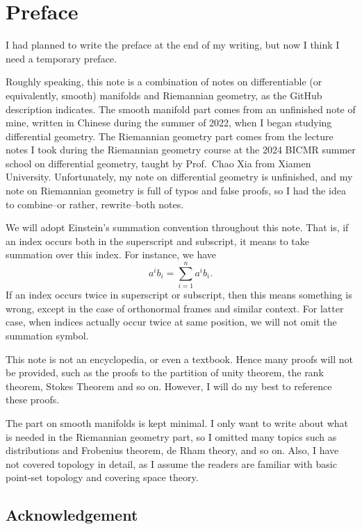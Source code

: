 \chapter{Preface}


I had planned to write the preface at the end of my writing, but now I think I need a temporary preface.

Roughly speaking, this note is a combination of notes on differentiable (or equivalently, smooth) manifolds and Riemannian geometry, as the GitHub description indicates.
The smooth manifold part comes from an unfinished note of mine, written in Chinese during the summer of 2022, when I began studying differential geometry.
The Riemannian geometry part comes from the lecture notes I took during the Riemannian geometry course at the 2024 BICMR summer school on differential geometry, taught by Prof.\ Chao Xia from Xiamen University.
Unfortunately, my note on differential geometry is unfinished, and my note on Riemannian geometry is full of typos and false proofs, so I had the idea to combine--or rather, rewrite--both notes.

We will adopt Einstein's summation convention throughout this note.
That is, if an index occurs both in the superscript and subscript, it means to take summation over this index.
For instance, we have
\[a^ib_i=\sum_{i=1}^na^ib_i.\]
If an index occurs twice in superscript or subscript, then this means something is wrong, except in the case of orthonormal frames and similar context.
For latter case, when indices actually occur twice at same position, we will not omit the summation symbol. 

This note is not an encyclopedia, or even a textbook.
Hence many proofs will not be provided, such as the proofs to the partition of unity theorem, the rank theorem, Stokes Theorem and so on.
However, I will do my best to reference these proofs.

The part on smooth manifolds is kept minimal.
I only want to write about what is needed in the Riemannian geometry part, so I omitted many topics such as distributions and Frobenius theorem, de Rham theory, and so on.
Also, I have not covered topology in detail, as I assume the readers are familiar with basic point-set topology and covering space theory.

\section*{Acknowledgement}

